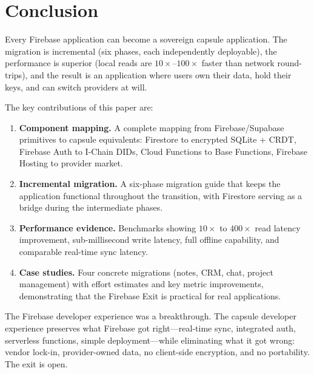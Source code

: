 \section{Conclusion}
\label{sec:conclusion}

Every Firebase application can become a sovereign capsule application.
The migration is incremental (six phases, each independently deployable),
the performance is superior (local reads are $10\times$--$100\times$
faster than network round-trips), and the result is an application
where users own their data, hold their keys, and can switch providers
at will.

The key contributions of this paper are:

\begin{enumerate}
    \item \textbf{Component mapping.} A complete mapping from
    Firebase/Supabase primitives to capsule equivalents: Firestore
    to encrypted SQLite + CRDT, Firebase Auth to I-Chain DIDs,
    Cloud Functions to Base Functions, Firebase Hosting to provider
    market.

    \item \textbf{Incremental migration.} A six-phase migration guide
    that keeps the application functional throughout the transition,
    with Firestore serving as a bridge during the intermediate phases.

    \item \textbf{Performance evidence.} Benchmarks showing $10\times$
    to $400\times$ read latency improvement, sub-millisecond write
    latency, full offline capability, and comparable real-time sync
    latency.

    \item \textbf{Case studies.} Four concrete migrations (notes, CRM,
    chat, project management) with effort estimates and key metric
    improvements, demonstrating that the Firebase Exit is practical
    for real applications.
\end{enumerate}

The Firebase developer experience was a breakthrough. The capsule
developer experience preserves what Firebase got right---real-time sync,
integrated auth, serverless functions, simple deployment---while
eliminating what it got wrong: vendor lock-in, provider-owned data,
no client-side encryption, and no portability. The exit is open.

